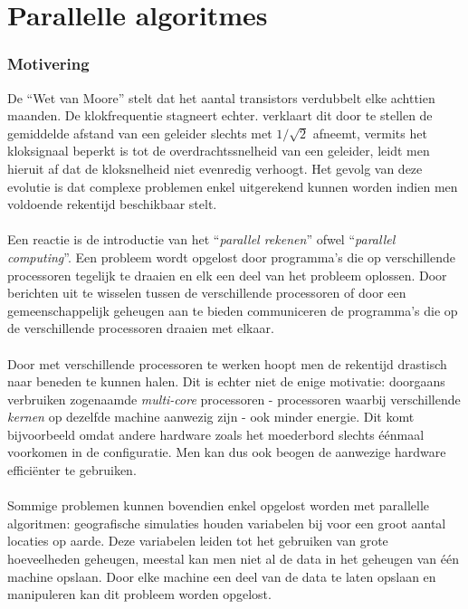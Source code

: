 \section{Parallelle algoritmes}

\subsubsection{Motivering}

De ``Wet van Moore''\cite{4785860} stelt dat het aantal transistors verdubbelt elke achttien maanden. De klokfrequentie stagneert echter. \cite{nomoore} verklaart dit door te stellen de gemiddelde afstand van een geleider slechts met $1/\sqrt{2}$ afneemt, vermits het kloksignaal beperkt is tot de overdrachtssnelheid van een geleider, leidt men hieruit af dat de kloksnelheid niet evenredig verhoogt. Het gevolg van deze evolutie is dat complexe problemen enkel uitgerekend kunnen worden indien men voldoende rekentijd beschikbaar stelt.
\paragraph{}
Een reactie is de introductie van het ``\emph{parallel rekenen}'' ofwel ``\emph{parallel computing}''. Een probleem wordt opgelost door programma's die op verschillende processoren tegelijk te draaien en elk een deel van het probleem oplossen. Door berichten uit te wisselen tussen de verschillende processoren of door een gemeenschappelijk geheugen aan te bieden communiceren de programma's die op de verschillende processoren draaien met elkaar.\cite{books/bc/KumarGGK94}

\paragraph{}
Door met verschillende processoren te werken hoopt men de rekentijd drastisch naar beneden te kunnen halen. Dit is echter niet de enige motivatie: doorgaans verbruiken zogenaamde \emph{multi-core} processoren - processoren waarbij verschillende \emph{kernen} op dezelfde machine aanwezig zijn - ook minder energie. Dit komt bijvoorbeeld omdat andere hardware zoals het moederbord slechts \'e\'enmaal voorkomen in de configuratie. Men kan dus ook beogen de aanwezige hardware effici\"enter te gebruiken.\cite{Korthikanti:2009:APA:1678990.1679696,parenergy}

\paragraph{}
Sommige problemen kunnen bovendien enkel opgelost worden met parallelle algoritmen: geografische simulaties houden variabelen bij voor een groot aantal locaties op aarde. Deze variabelen leiden tot het gebruiken van grote hoeveelheden geheugen, meestal kan men niet al de data in het geheugen van \'e\'en machine opslaan. Door elke machine een deel van de data te laten opslaan en manipuleren kan dit probleem worden opgelost.\cite{journals/pc/HawickCJ03}

